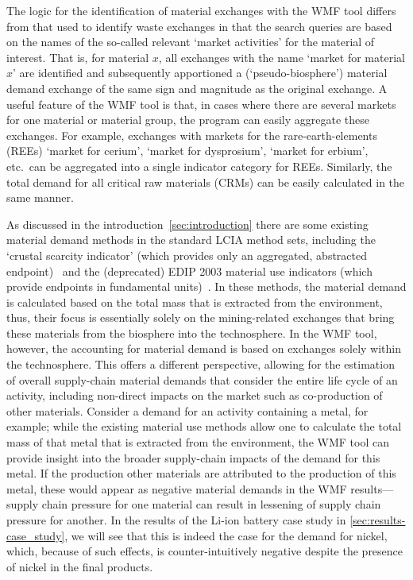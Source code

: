 The logic for the identification of material exchanges with the WMF tool differs from that used to identify waste exchanges in that the search queries are based on the names of the so-called relevant `market activities' for the material of interest. That is, for material $x$, all exchanges with the name `market for material $x$' are identified and subsequently apportioned a (`pseudo-biosphere') material demand exchange of the same sign and magnitude as the original exchange. A useful feature of the WMF tool is that, in cases where there are several markets for one material or material group, the program can easily aggregate these exchanges. For example, exchanges with markets for the rare-earth-elements (REEs) `market for cerium', `market for dysprosium', `market for erbium', etc.\ can be aggregated into a single indicator category for REEs. Similarly, the total demand for all critical raw materials (CRMs) can be easily calculated in the same manner. 

As discussed in the introduction~\ref{sec:introduction} there are some existing material demand methods in the standard LCIA method sets, including the `crustal scarcity indicator' (which provides only an aggregated, abstracted endpoint)~\citep{arvidsson2020csi} and the (deprecated) EDIP 2003 material use indicators (which provide endpoints in fundamental units)~\citep{hauschild2003edip}. In these methods, the material demand is calculated based on the total mass that is extracted from the environment, thus, their focus is essentially solely on the mining-related exchanges that bring these materials from the biosphere into the technosphere. In the WMF tool, however, the accounting for material demand is based on exchanges solely within the technosphere. This offers a different perspective, allowing for the estimation of overall supply-chain material demands that consider the entire life cycle of an activity, including non-direct impacts on the market such as co-production of other materials. Consider a demand for an activity containing a metal, for example; while the existing material use methods allow one to calculate the total mass of that metal that is extracted from the environment, the WMF tool can provide insight into the broader supply-chain impacts of the demand for this metal. If the production other materials are attributed to the production of this metal, these would appear as negative material demands in the WMF results---supply chain pressure for one material can result in lessening of supply chain pressure for another. In the results of the Li-ion battery case study in \autoref{sec:results-case_study}, we will see that this is indeed the case for the demand for nickel, which, because of such effects, is counter-intuitively negative despite the presence of nickel in the final products.


